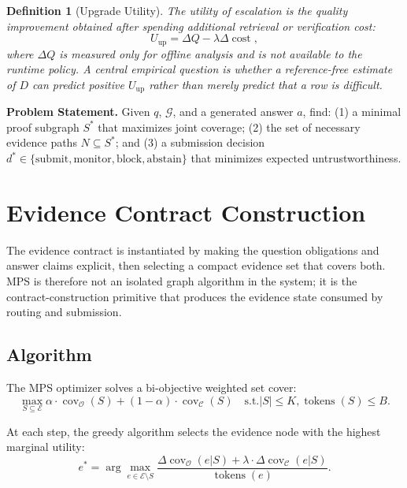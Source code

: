 \documentclass[journal,onecolumn,11pt]{IEEEtran}
\newtheorem{definition}{Definition}
\begin{document}
\begin{definition}[Upgrade Utility]
The utility of escalation is the quality improvement obtained after spending additional retrieval or verification cost:
\begin{equation}
U_{\text{up}} = \Delta Q - \lambda \Delta \operatorname{cost},
\end{equation}
where $\Delta Q$ is measured only for offline analysis and is not available to the runtime policy. A central empirical question is whether a reference-free estimate of $D$ can predict positive $U_{\text{up}}$ rather than merely predict that a row is difficult.
\end{definition}

\textbf{Problem Statement.} Given $q$, $\mathcal{G}$, and a generated answer $a$, find: (1) a minimal proof subgraph $S^*$ that maximizes joint coverage; (2) the set of necessary evidence paths $N \subseteq S^*$; and (3) a submission decision $d^* \in \{\text{submit}, \text{monitor}, \text{block}, \text{abstain}\}$ that minimizes expected untrustworthiness.


\section{Evidence Contract Construction}
\label{sec:mps}

The evidence contract is instantiated by making the question obligations and answer claims explicit, then selecting a compact evidence set that covers both. MPS is therefore not an isolated graph algorithm in the system; it is the contract-construction primitive that produces the evidence state consumed by routing and submission.

\subsection{Algorithm}

The MPS optimizer solves a bi-objective weighted set cover:
\begin{equation}
\max_{S \subseteq \mathcal{E}} \alpha \cdot \operatorname{cov}_{\mathcal{O}}(S) + (1-\alpha) \cdot \operatorname{cov}_{\mathcal{C}}(S) \quad \text{s.t.} |S| \leq K, \operatorname{tokens}(S) \leq B.
\end{equation}

At each step, the greedy algorithm selects the evidence node with the highest marginal utility:
\begin{equation}
e^* = \arg\max_{e \in \mathcal{E} \setminus S} \frac{\Delta \operatorname{cov}_{\mathcal{O}}(e | S) + \lambda \cdot \Delta \operatorname{cov}_{\mathcal{C}}(e | S)}{\operatorname{tokens}(e)}.
\end{equation}
\end{document}
